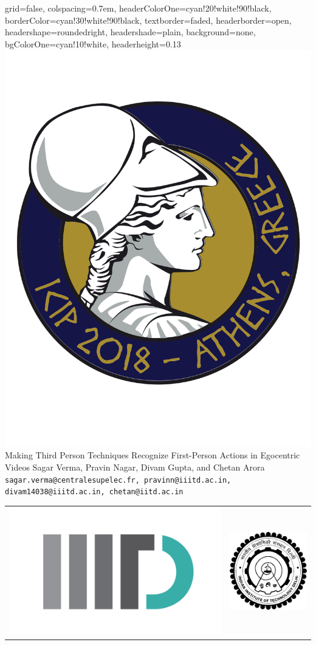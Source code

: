 \documentclass[landscape,a0paper,fontscale=0.292]{baposter}
\begin{document}
\begin{poster}{
 grid=false,
 colspacing=0.7em,
 headerColorOne=cyan!20!white!90!black,
 borderColor=cyan!30!white!90!black,
 textborder=faded,
 headerborder=open,
 headershape=roundedright,
 headershade=plain,
 background=none,
 bgColorOne=cyan!10!white,
 headerheight=0.13\textheight}
 {
      \includegraphics[width=0.08 \linewidth]{logo_icip}
 }
 {\sc\Huge Making Third Person Techniques Recognize First-Person Actions in Egocentric Videos}
 {Sagar Verma, Pravin Nagar, Divam Gupta, and Chetan Arora\\[1em]
 {\texttt{sagar.verma@centralesupelec.fr, pravinn@iiitd.ac.in, divam14038@iiitd.ac.in, chetan@iitd.ac.in}}}
 {
  \begin{tabular}{r r}
    \includegraphics[height=0.08\textheight]{logo_iiitd} &
    \includegraphics[height=0.08\textheight]{logo_iitd} \\
  \end{tabular}
 }


\end{poster}
\end{document}
